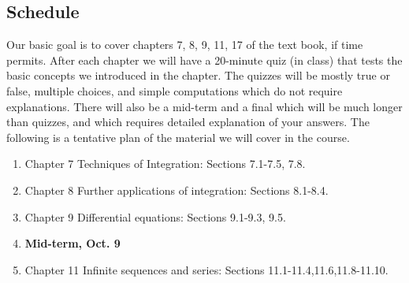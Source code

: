 \documentclass[margin,line]{res}
\newenvironment{list2}{
  \begin{list}{$\bullet$}{%
      \setlength{\itemsep}{0in}
      \setlength{\parsep}{0in} \setlength{\parskip}{0in}
      \setlength{\topsep}{0in} \setlength{\partopsep}{0in}
      \setlength{\leftmargin}{0.2in}}}{\end{list}}
\begin{document}
\begin{resume}
\section{\sc Schedule}
Our basic goal is to cover chapters 7, 8, 9, 11, 17 of the text book, if time permits. After each chapter we will have a 20-minute quiz (in class) that tests the basic concepts we introduced in the chapter. The quizzes will be mostly true or false, multiple choices, and simple computations which do not require explanations. There will also be a mid-term and a final which will be much longer than quizzes, and which requires detailed explanation of your answers. The following is a tentative plan of the material we will cover in the course.
\begin{enumerate}
\item Chapter 7 Techniques of Integration: Sections 7.1-7.5, 7.8.
\item Chapter 8 Further applications of integration: Sections 8.1-8.4.
\item Chapter 9 Differential equations: Sections 9.1-9.3, 9.5.
\item {\bf Mid-term, Oct. 9}
\item Chapter 11 Infinite sequences and series: Sections 11.1-11.4,11.6,11.8-11.10.

\end{enumerate}
\end{resume}
\end{document}
